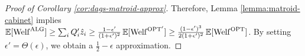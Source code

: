 \begin{proof}[Proof of Corollary \ref{cor:dags-matroid-approx}]
  Therefore, Lemma \ref{lemma:matroid-cabinet} implies $\operatorname*{\mathbb{E}}[\mathrm{Welf}^{\mathrm{ALG}}] \geq \sum_i Q_i' \hat{z}_i \geq \frac{1-\epsilon'}{(1+\epsilon')^2} \operatorname*{\mathbb{E}}[\mathrm{Welf}^{\mathrm{OPT}'}] \geq \frac{(1-\epsilon')^3}{2(1+\epsilon')^2} \operatorname*{\mathbb{E}}[ \mathrm{Welf}^{\mathrm{OPT}}]$.
  By setting $\epsilon' = \Theta(\epsilon)$, we obtain a $\frac{1}{2}-\epsilon$ approximation.
\end{proof}








      







